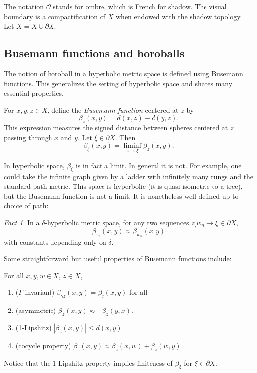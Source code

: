 \documentclass[11pt]{amsart}
\theoremstyle{plain}
\theoremstyle{definition}
\theoremstyle{remark}
\newtheorem{fact}[proposition]{Fact}
\begin{document}
The notation $\mathcal O$ stands for ombre, which is French for shadow. 
The visual boundary is a compactification of
$X$ when endowed with the shadow topology. Let $\bar{X}=X\cup\partial X$. 

\subsection{Busemann functions and horoballs}

The notion of horoball in a hyperbolic metric space is defined using
Busemann functions. This generalizes the setting of hyperbolic space and
shares many essential properties.

For $x,y,z\in X$, define the {\em Busemann function} centered at $z$ by 
\[
  \beta_z(x,y)=d(x,z)-d(y,z).
\]
This expression measures the signed distance between spheres centered at
$z$ passing through $x$ and $y$. 
Let $\xi\in \partial X$. Then 
\[
  \beta_\xi(x,y)=\liminf_{z\to\xi} \beta_z(x,y). 
\]

In hyperbolic space, $\beta_\xi$ is in fact a limit. In general it is not.
For example, one could take the infinite graph given by a ladder with
infinitely many rungs and the standard path metric. This space is 
hyperbolic (it is quasi-isometric to a tree), but the Busemann function is
not a limit. It is nonetheless well-defined up to choice of path:

\begin{fact}
  In a $\delta$-hyperbolic metric space, for any two sequences
  $z_,w_n\to\xi\in\partial X$, 
  \[
    \beta_{z_n}(x,y)\approx\beta_{w_n}(x,y)
  \]
  with constants depending only on $\delta$. 
\end{fact}

Some straightforward but useful 
properties of Busemann functions include:

For all $x,y,w\in X$, $z\in \bar{X}$, 
\begin{enumerate}
  \item ($\Gamma$-invariant) $\beta_{\gamma z}(x,y)=\beta_z(x,y)$ for all
  \item (asymmetric) $\beta_z (x,y) \approx -\beta_z(y,x)$. 
  \item (1-Lipshitz) $|\beta_z(x,y)|\leq d(x,y)$. 
  \item (cocycle property) $\beta_z(x,y)\approx
    \beta_z(x,w)+\beta_z(w,y)$.
\end{enumerate}

Notice that the $1$-Lipshitz property implies finiteness of $\beta_\xi$ for
$\xi\in\partial X$. 
\end{document}
